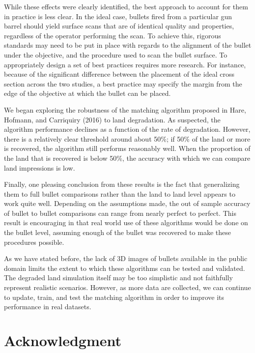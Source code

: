 \documentclass[12pt,]{article}
\theoremstyle{definition}
\theoremstyle{definition}
\theoremstyle{definition}
\theoremstyle{remark}
\begin{document}
While these effects were clearly identified, the best approach to
account for them in practice is less clear. In the ideal case, bullets
fired from a particular gun barrel should yield surface scans that are
of identical quality and properties, regardless of the operator
performing the scan. To achieve this, rigorous standards may need to be
put in place with regards to the alignment of the bullet under the
objective, and the procedure used to scan the bullet surface. To
appropriately design a set of best practices requires more research. For
instance, because of the significant difference between the placement of
the ideal cross section across the two studies, a best practice may
specify the margin from the edge of the objective at which the bullet
can be placed.

We began exploring the robustness of the matching algorithm proposed in
Hare, Hofmann, and Carriquiry (2016) to land degradation. As suspected,
the algorithm performance declines as a function of the rate of
degradation. However, there is a relatively clear threshold around about
50\%; if 50\% of the land or more is recovered, the algorithm still
performs reasonably well. When the proportion of the land that is
recovered is below 50\%, the accuracy with which we can compare land
impressions is low.

Finally, one pleasing conclusion from these results is the fact that
generalizing them to full bullet comparisons rather than the land to
land level appears to work quite well. Depending on the assumptions
made, the out of sample accuracy of bullet to bullet comparisons can
range from nearly perfect to perfect. This result is encouraging in that
real world use of these algorithms would be done on the bullet level,
assuming enough of the bullet was recovered to make these procedures
possible.

As we have stated before, the lack of 3D images of bullets available in
the public domain limits the extent to which these algorithms can be
tested and validated. The degraded land simulation itself may be too
simplistic and not faithfully represent realistic scenarios. However, as
more data are collected, we can continue to update, train, and test the
matching algorithm in order to improve its performance in real datasets.

\section{Acknowledgment}\label{acknowledgment}
\end{document}

